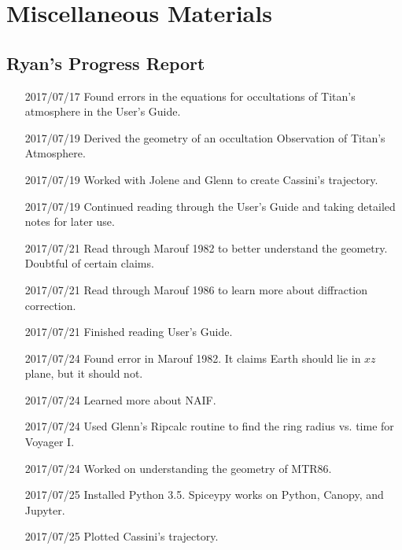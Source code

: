 \documentclass[crop=false,class=article,oneside]{standalone}
\begin{document}
    \ifx\ifphysicscourseselectromagnetismI\undefined
        \section*{Miscellaneous Materials}
        \setcounter{section}{1}
    \fi
    \subsection{Ryan's Progress Report}
        \begin{enumerate}[leftmargin=55pt]
            \item[2017/07/17] Found errors in the equations
                              for occultations of Titan's atmosphere
                              in the User's Guide.
            \item[2017/07/19] Derived the geometry of an occultation
                              Observation of Titan's Atmosphere.
            \item[2017/07/19] Worked with Jolene and Glenn
                              to create Cassini's trajectory.
            \item[2017/07/19] Continued reading through the User's Guide
                              and taking detailed notes for later use.
            \item[2017/07/21] Read through Marouf 1982 to better understand
                              the geometry. Doubtful of certain claims.
            \item[2017/07/21] Read through Marouf 1986 to learn more
                              about diffraction correction.
            \item[2017/07/21] Finished reading User's Guide.
            \item[2017/07/24] Found error in Marouf 1982. It claims
                              Earth should lie in $xz$ plane,
                              but it should not.
            \item[2017/07/24] Learned more about NAIF.
            \item[2017/07/24] Used Glenn's Ripcalc routine to find the
                              ring radius vs. time for Voyager I.
            \item[2017/07/24] Worked on understanding the geometry of MTR86.
            \item[2017/07/25] Installed Python 3.5. Spiceypy works on Python,
                              Canopy, and Jupyter.
            \item[2017/07/25] Plotted Cassini's trajectory.

\end{enumerate}
\end{document}
